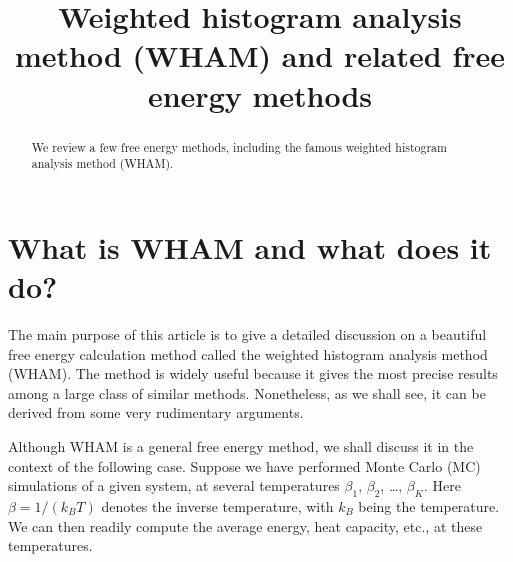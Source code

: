 \documentclass[aip,jcp,preprint,superscriptaddress]{revtex4-1}
\begin{document}
\newcommand{\vct}[1]{\mathbf{#1}}
\newcommand{\vx}{\vct{x}}
\newcommand{\vy}{\vct{y}}
\newcommand{\Z}{\mathcal{Z}}
\newcommand{\E}{\mathcal{E}}
\newcommand{\Ham}{\mathcal{H}}
\newcommand{\W}{\mathcal{W}}
\newcommand{\A}{\mathcal{A}}
\newcommand{\var}{\mathrm{var}}
\newcommand{\com}{\mathrm{com}}

\newcommand{\llbra}{[\![}
\newcommand{\llket}{]\!]}

\newcommand{\repl}[2]{{\color{gray} [#1] }{\color{blue} #2}}
\newcommand{\add}[1]{{\color{blue} #1}}
\newcommand{\del}[1]{{\color{gray} [#1]}}
\newcommand{\note}[1]{{\color{OliveGreen}\small [\textbf{Comment.} #1]}}





\title{Weighted histogram analysis method (WHAM)
and related free energy methods}


\begin{abstract}
  We review a few free energy methods,
  including the famous weighted histogram analysis method (WHAM).
\end{abstract}

\maketitle

\tableofcontents



\section{What is WHAM and what does it do?}



The main purpose of this article is
to give a detailed discussion on
a beautiful free energy calculation method called
the weighted histogram analysis method (WHAM)\cite{
ferrenberg1988, *ferrenberg1989, kumar1992,
newman, frenkel}.
%
The method is widely useful because
it gives the most precise results
among a large class of similar methods.
%
Nonetheless, as we shall see,
it can be derived from some very rudimentary arguments.



Although WHAM is a general free energy method,
we shall discuss it in the context of the following case.
%
Suppose we have performed Monte Carlo (MC) simulations of a given system,
at several temperatures $\beta_1$, $\beta_2$, \dots, $\beta_K$.
%
Here $\beta = 1/(k_B T)$ denotes the inverse temperature,
with $k_B$ being the temperature.
%
We can then readily compute the average energy, heat capacity, etc.,
at these temperatures.
\end{document}
